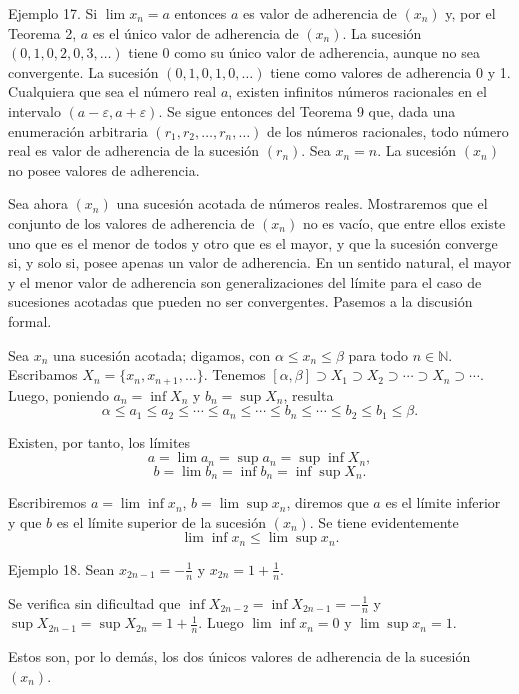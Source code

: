 \documentclass[12pt,oneside]{book}
\begin{document}
Ejemplo 17. Si \(\lim x_n = a\) entonces \(a\) es valor de adherencia de \((x_n)\) y, por el Teorema 2, \(a\) es el único valor de adherencia de \((x_n)\). La sucesión \((0, 1, 0, 2, 0, 3, \ldots)\) tiene 0 como su único valor de adherencia, aunque no sea convergente. La sucesión \((0, 1, 0, 1, 0, \ldots)\) tiene como valores de adherencia 0 y 1. Cualquiera que sea el número real \(a\), existen infinitos números racionales en el intervalo \((a-\varepsilon, a+\varepsilon)\). Se sigue entonces del Teorema 9 que, dada una enumeración arbitraria \((r_1, r_2, \ldots, r_n, \ldots)\) de los números racionales, todo número real es valor de adherencia de la sucesión \((r_n)\). Sea \(x_n = n\). La sucesión \((x_n)\) no posee valores de adherencia.

Sea ahora \((x_n)\) una sucesión acotada de números reales. Mostraremos que el conjunto de los valores de adherencia de \((x_n)\) no es vacío, que entre ellos existe uno que es el menor de todos y otro que es el mayor, y que la sucesión converge si, y solo si, posee apenas un valor de adherencia. En un sentido natural, el mayor y el menor valor de adherencia son generalizaciones del límite para el caso de sucesiones acotadas que pueden no ser convergentes. Pasemos a la discusión formal.

Sea \(x_n\) una sucesión acotada; digamos, con \(\alpha \leq x_n \leq \beta\) para todo \(n \in \mathbb{N}\). Escribamos \(X_n = \{x_n, x_{n+1}, \dots\}\). Tenemos \([\alpha, \beta] \supset X_1 \supset X_2 \supset \cdots \supset X_n \supset \cdots\). Luego, poniendo \(a_n = \inf X_n\) y \(b_n = \sup X_n\), resulta
\[
\alpha \leq a_1 \leq a_2 \leq \cdots \leq a_n \leq \cdots \leq b_n \leq \cdots \leq b_2 \leq b_1 \leq \beta.
\]

Existen, por tanto, los límites
\[
a = \lim a_n = \sup a_n = \sup \inf X_n,
\]
\[
b = \lim b_n = \inf b_n = \inf \sup X_n.
\]

Escribiremos \(a = \lim \inf x_n\), \(b = \lim \sup x_n\), diremos que \(a\) es el límite inferior y que \(b\) es el límite superior de la sucesión \((x_n)\). Se tiene evidentemente
\[
\lim \inf x_n \leq \lim \sup x_n.
\]

Ejemplo 18. Sean \(x_{2n-1} = -\frac{1}{n}\) y \(x_{2n} = 1 + \frac{1}{n}\).

Se verifica sin dificultad que \(\inf X_{2n-2} = \inf X_{2n-1} = -\frac{1}{n}\) y \(\sup X_{2n-1} = \sup X_{2n} = 1 + \frac{1}{n}\). Luego \(\lim \inf x_n = 0\) y \(\lim \sup x_n = 1\).

Estos son, por lo demás, los dos únicos valores de adherencia de la sucesión \((x_n)\).
\end{document}
